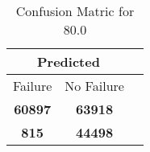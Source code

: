 \begin{table}[] 
\caption{Confusion Matric for 80.0} 
\label{Table: Prediction Accuracy-DMD80.0OnlySunEKF-resetReflectionEKF-top2-Reflection} 
\centering 
\begin{tabular} 
 {@{}ccc@{}} 
\toprule 
\multicolumn{2}{c}{\textbf{Predicted}}
 \\ \midrule 
\multicolumn{1}{|c|}{Failure} & 
\multicolumn{1}{c|}{No Failure}
 \\ \midrule 
\multicolumn{1}{|c|}{\color{green}\textbf{60897}} & 
\multicolumn{1}{c|}{\color{green}\textbf{63918}}
 \\ \midrule 
\multicolumn{1}{|c|}{\color{red}\textbf{815}} & 
\multicolumn{1}{c|}{\color{red}\textbf{44498}}
 \\ \bottomrule 
\end{tabular} 
\end{table} 

